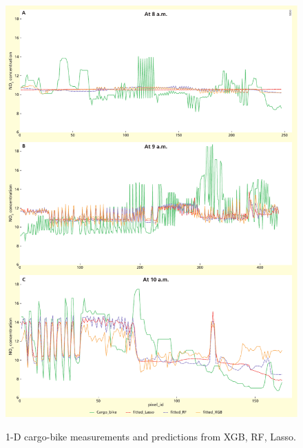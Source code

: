 \documentclass{article}
\begin{document}
\begin{figure}[H]
    \includegraphics[width=\linewidth]{graphs.pdf}
    \label{nldepred}
    \caption {1-D cargo-bike measurements and predictions from XGB,  RF,  Lasso.}
\end{figure}
\end{document}
